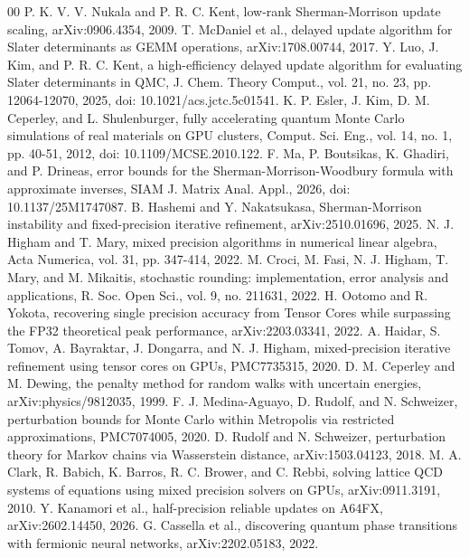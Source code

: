 \documentclass[conference]{IEEEtran}
\begin{document}
\begin{thebibliography}{00}
 P. K. V. V. Nukala and P. R. C. Kent, low-rank Sherman-Morrison update scaling, arXiv:0906.4354, 2009.
 T. McDaniel et al., delayed update algorithm for Slater determinants as GEMM operations, arXiv:1708.00744, 2017.
 Y. Luo, J. Kim, and P. R. C. Kent, a high-efficiency delayed update algorithm for evaluating Slater determinants in QMC, J. Chem. Theory Comput., vol. 21, no. 23, pp. 12064-12070, 2025, doi: 10.1021/acs.jctc.5c01541.
 K. P. Esler, J. Kim, D. M. Ceperley, and L. Shulenburger, fully accelerating quantum Monte Carlo simulations of real materials on GPU clusters, Comput. Sci. Eng., vol. 14, no. 1, pp. 40-51, 2012, doi: 10.1109/MCSE.2010.122.
 F. Ma, P. Boutsikas, K. Ghadiri, and P. Drineas, error bounds for the Sherman-Morrison-Woodbury formula with approximate inverses, SIAM J. Matrix Anal. Appl., 2026, doi: 10.1137/25M1747087.
 B. Hashemi and Y. Nakatsukasa, Sherman-Morrison instability and fixed-precision iterative refinement, arXiv:2510.01696, 2025.
 N. J. Higham and T. Mary, mixed precision algorithms in numerical linear algebra, Acta Numerica, vol. 31, pp. 347-414, 2022.
 M. Croci, M. Fasi, N. J. Higham, T. Mary, and M. Mikaitis, stochastic rounding: implementation, error analysis and applications, R. Soc. Open Sci., vol. 9, no. 211631, 2022.
 H. Ootomo and R. Yokota, recovering single precision accuracy from Tensor Cores while surpassing the FP32 theoretical peak performance, arXiv:2203.03341, 2022.
 A. Haidar, S. Tomov, A. Bayraktar, J. Dongarra, and N. J. Higham, mixed-precision iterative refinement using tensor cores on GPUs, PMC7735315, 2020.
 D. M. Ceperley and M. Dewing, the penalty method for random walks with uncertain energies, arXiv:physics/9812035, 1999.
 F. J. Medina-Aguayo, D. Rudolf, and N. Schweizer, perturbation bounds for Monte Carlo within Metropolis via restricted approximations, PMC7074005, 2020.
 D. Rudolf and N. Schweizer, perturbation theory for Markov chains via Wasserstein distance, arXiv:1503.04123, 2018.
 M. A. Clark, R. Babich, K. Barros, R. C. Brower, and C. Rebbi, solving lattice QCD systems of equations using mixed precision solvers on GPUs, arXiv:0911.3191, 2010.
 Y. Kanamori et al., half-precision reliable updates on A64FX, arXiv:2602.14450, 2026.
 G. Cassella et al., discovering quantum phase transitions with fermionic neural networks, arXiv:2202.05183, 2022.
\end{thebibliography}
\end{document}
